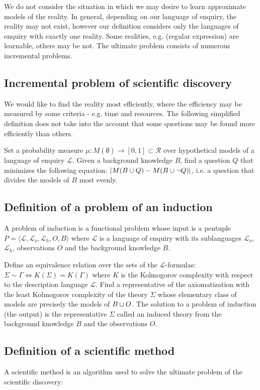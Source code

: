 We do not consider the situation in which we may desire to learn approximate models of the reality. In general, depending on our language of enquiry, the reality may not exist, however our definition considers only the languages of enquiry with exactly one reality. Some realities, e.g. (regular expression) are learnable, others may be not. The ultimate problem consists of numerous incremental problems.

\subsection{Incremental problem of scientific discovery}
We would like to find the reality most efficiently, where the efficiency may be measured by some criteria - e.g. time and resources. The following simplified definition does not take into the account that some questions may be found more efficiently than others.

Set a probability measure $\mu:M(\emptyset) \to [0,1] \subset \mathcal{R}$ over hypothetical models of a language of enquiry $\mathcal{L}$. Given a background knowledge $B$, find a question $Q$ that minimizes the following equation: $|M(B \cup {Q})-M(B \cup {\neg Q})|$, i.e. a question that divides the models of $B$ most evenly.

\subsection{Definition of a problem of an induction}
A problem of induction is a functional problem whose input is a pentuple $P=\langle\mathcal{L}, \mathcal{L}_o, \mathcal{L}_h, O, B\rangle$ where $\mathcal{L}$ is a language of enquiry with its sublanguages $\mathcal{L}_o$, $\mathcal{L}_h$, observations $O$ and the background knowledge $B$.

Define an equivalence relation over the sets of the $\mathcal{L}$-formulas: $\Sigma \sim \Gamma \iff K(\Sigma)=K(\Gamma)$ where $K$ is the Kolmogorov complexity with respect to the description language $\mathcal{L}$. Find a representative of the axiomatization with the least Kolmogorov complexity of the theory $\Sigma$ whose elementary class of models are precisely the models of $B \cup O$. The solution  to a problem of induction (the output) is the representative $\Sigma$ called an induced theory from the background knowledge $B$ and the observations $O$.

\subsection{Definition of a scientific method}
A scientific method is an algorithm used to solve the ultimate problem of the scientific discovery:

